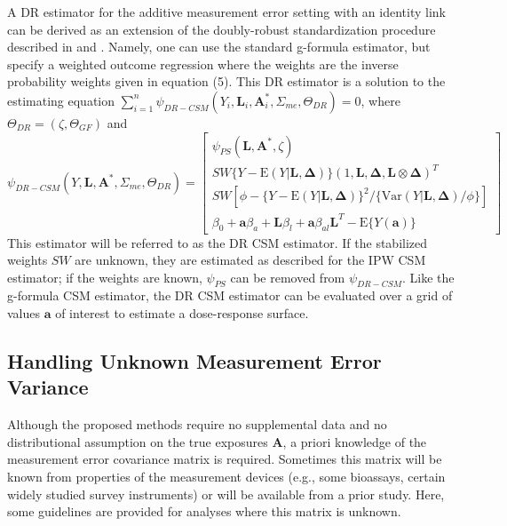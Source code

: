 \documentclass[useAMS,usenatbib,referee]{biom}
\begin{document}
A DR estimator for the additive measurement error setting with an identity link can be derived as an extension of the doubly-robust standardization procedure described in \citet{vansteelandt2011} and \citet{kang2007}. Namely, one can use the standard g-formula estimator, but specify a weighted outcome regression where the weights are the inverse probability weights given in equation (5). This DR estimator is a solution to the estimating equation $\sum_{i=1}^{n} \psi_{DR-CSM}(Y_{i}, \bm{L}_{i}, \bm{A}_{i}^{*}, \Sigma_{me}, \Theta_{DR}) = 0$, where $\Theta_{DR} = (\zeta, \Theta_{GF})$ and
\begin{equation}
    \psi_{DR-CSM}(Y, \bm{L}, \bm{A}^{*}, \Sigma_{me}, \Theta_{DR}) =
    \begin{bmatrix}
        \psi_{PS}(\bm{L}, \bm{A}^{*}, \zeta) \\
       SW\{ Y - \text{E}(Y | \bm{L}, \bm{\Delta}) \} (1, \bm{L}, \bm{\Delta}, \bm{L} \otimes \bm{\Delta})^{T} \\
        SW[\phi - \{ Y - \text{E}(Y | \bm{L}, \bm{\Delta}) \}^{2} / \{ \text{Var}(Y | \bm{L}, \bm{\Delta}) / \phi \}] \\
        \beta_{0} + \bm{a}\beta_{a} + \bm{L}\beta_{l} +
        \bm{a}\beta_{al}\bm{L}^{T} - \text{E} \{ Y(\bm{a}) \}
    \end{bmatrix}
\end{equation}
This estimator will be referred to as the DR CSM estimator. If the stabilized weights $SW$ are unknown, they are estimated as described for the IPW CSM estimator; if the weights are known, $\psi_{PS}$ can be removed from $\psi_{DR-CSM}$. Like the g-formula CSM estimator, the DR CSM estimator can be evaluated over a grid of values $\bm{a}$ of interest to estimate a dose-response surface.

\subsection{Handling Unknown Measurement Error Variance}

Although the proposed methods require no supplemental data and no distributional assumption on the true exposures $\bm{A}$, a priori knowledge of the measurement error covariance matrix is required. Sometimes this matrix will be known from properties of the measurement devices (e.g., some bioassays, certain widely studied survey instruments) or will be available from a prior study. Here, some guidelines are provided for analyses where this matrix is unknown.
\end{document}
